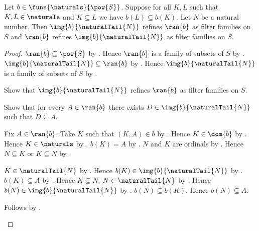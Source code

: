 \begin{theorem}\label{antitone_natural_tail_range_mutual_refinement}
    Let $b\in\funs{\naturals}{\pow{S}}$.
    Suppose for all $K,L$ such that $K,L\in\naturals$ and $K\subseteq L$
        we have $b(L)\subseteq b(K)$.
    Let $N$ be a natural number.
    Then $\img{b}{\naturalTail{N}}$ refines $\ran{b}$
        as filter families on $S$ and
        $\ran{b}$ refines $\img{b}{\naturalTail{N}}$
        as filter families on $S$.
\end{theorem}
\begin{proof}
    $\ran{b}\subseteq\pow{S}$ by .
    Hence $\ran{b}$ is a family of subsets of $S$
        by .
    $\img{b}{\naturalTail{N}}\subseteq\ran{b}$
        by .
    Hence $\img{b}{\naturalTail{N}}$ is a family of subsets of $S$
        by .

    Show that $\img{b}{\naturalTail{N}}$ refines $\ran{b}$
        as filter families on $S$.
    \begin{subproof}
        Show that for every $A\in\ran{b}$ there exists
            $D\in\img{b}{\naturalTail{N}}$ such that $D\subseteq A$.
        \begin{subproof}
            Fix $A\in\ran{b}$.
            Take $K$ such that $(K,A)\in b$ by .
            Hence $K\in\dom{b}$ by .
            Hence $K\in\naturals$ by .
            $b(K)=A$ by .
            $N$ and $K$ are ordinals
                by .
            Hence $N\subseteq K$ or $K\subseteq N$
                by .
            \begin{byCase}
                $K\in\naturalTail{N}$ by .
                Hence $b(K)\in\img{b}{\naturalTail{N}}$
                    by .
                $b(K)\subseteq A$ by .
                Hence $K\subseteq N$.
                $N\in\naturalTail{N}$
                    by .
                Hence $b(N)\in\img{b}{\naturalTail{N}}$
                    by .
                $b(N)\subseteq b(K)$.
                Hence $b(N)\subseteq A$.
            \end{byCase}
        \end{subproof}
        Follows by .
    \end{subproof}


\end{proof}
